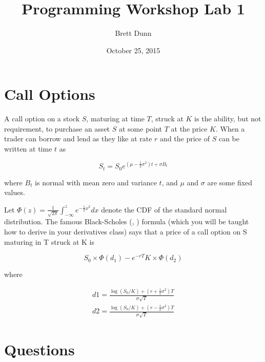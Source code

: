 \documentclass[12pt]{article}
\title{Programming Workshop Lab 1}
\date{October 25, 2015}
\author{Brett Dunn}
\begin{document}
\maketitle

\section{Call Options}
A call option on a stock $S$, maturing at time $T$, struck at $K$
is the ability, but not requirement, to purchase an asset $S$ at some
point $T$ at the price $K$. When a trader can borrow and lend as they like
at rate $r$ and the price of $S$ can be written at time $t$ as

\[
S_t = S_0 e^{\left(\mu-\frac{1}{2} \sigma^2 \right) t + \sigma B_t}
\]

where $B_t$ is normal with mean zero and variance $t$, and $\mu$ and
$\sigma$ are some fixed values.

Let $\Phi(z) = \frac{1}{\sqrt{2 \pi}} \int_{-\infty}^z e^{-\frac{1}{2}
  x^2}dx$ denote the CDF of the standard normal distribution. The
famous Black-Scholes (\cite{black1973pricing},
\cite{merton1973theory}) formula (which you will be taught how to
derive in your derivatives class) says that a price of a call option
on S maturing in T struck at K is

\[
S_0 \times \Phi(d_1) - e^{-rT} K \times \Phi(d_2)
\]

where

\begin{eqnarray*}
  d1 = \frac{\log(S_0 / K) + \left(r + \frac{1}{2} \sigma^2 \right)
    T}{\sigma \sqrt{T}} \\
  d2 = \frac{\log(S_0 / K) + \left(r - \frac{1}{2} \sigma^2 \right)
    T}{\sigma \sqrt{T}}
\end{eqnarray*}

\section{Questions}
\end{document}
